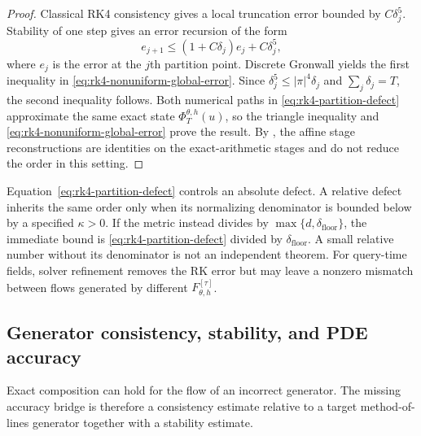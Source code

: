 \begin{proof}
Classical RK4 consistency gives a local truncation error bounded by $C\delta_j^5$.  Stability of one step gives an error recursion of the form
\begin{equation*}
e_{j+1}\leq(1+C\delta_j)e_j+C\delta_j^5,
\end{equation*}
where $e_j$ is the error at the $j$th partition point.  Discrete Gronwall yields the first inequality in \eqref{eq:rk4-nonuniform-global-error}.  Since $\delta_j^5\leq |\pi|^4\delta_j$ and $\sum_j\delta_j=T$, the second inequality follows.  Both numerical paths in \eqref{eq:rk4-partition-defect} approximate the same exact state $\Phi_T^{\theta,h}(u)$, so the triangle inequality and \eqref{eq:rk4-nonuniform-global-error} prove the result.  By , the affine stage reconstructions are identities on the exact-arithmetic stages and do not reduce the order in this setting.
\end{proof}

\begin{remark}\label{rem:relative-defect-denominator}
Equation~\eqref{eq:rk4-partition-defect} controls an absolute defect.  A relative defect inherits the same order only when its normalizing denominator is bounded below by a specified $\kappa>0$.  If the metric instead divides by $\max\{d,\delta_{\mathrm{floor}}\}$, the immediate bound is \eqref{eq:rk4-partition-defect} divided by $\delta_{\mathrm{floor}}$.  A small relative number without its denominator is not an independent theorem.  For query-time fields, solver refinement removes the RK error but may leave a nonzero mismatch between flows generated by different $F_{\theta,h}^{[\tau]}$.
\end{remark}

\subsection{Generator consistency, stability, and PDE accuracy}

Exact composition can hold for the flow of an incorrect generator.  The missing accuracy bridge is therefore a consistency estimate relative to a target method-of-lines generator together with a stability estimate.

